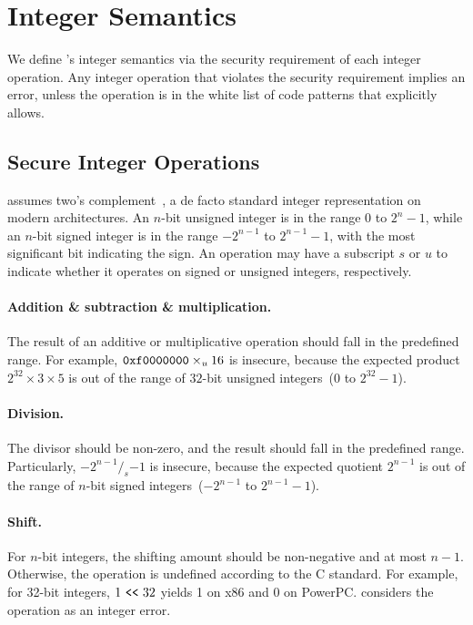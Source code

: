 \section{Integer Semantics}
\label{s:sema}

We define \sys's integer semantics via the security requirement of
each integer operation.  Any integer operation that violates the
security requirement implies an error, unless the operation is in
the white list of code patterns that \sys explicitly allows.

\subsection{Secure Integer Operations}
\label{s:sema:sec}

\sys assumes two's complement~\cite[\chapterautorefname~4.2.1]{intel:vol1},
a de facto standard integer representation on modern architectures.
An $n$-bit unsigned integer is in the range $0$ to $2^n-1$, while
an $n$-bit signed integer is in the range $-2^{n-1}$ to $2^{n-1}-1$,
with the most significant bit indicating the sign.  An operation
may have a subscript $s$ or $u$ to indicate whether it operates on
signed or unsigned integers, respectively.

\paragraph{Addition \& subtraction \& multiplication.}
The result of an additive or multiplicative operation should fall
in the predefined range.  For example,
$\texttt{0xf0000000}\times_u 16$ is insecure,
because the expected product $2^{32}\times
3\times 5$ is out of the range of $32$-bit unsigned integers~($0$
to $2^{32} - 1$).

\paragraph{Division.}
The divisor should be non-zero,
and the result should fall in the predefined range.
Particularly, $-2^{n-1} /_s {-1}$ is insecure,
because the expected quotient $2^{n-1}$ is out of
the range of $n$-bit signed integers~($-2^{n-1}$ to $2^{n-1}-1$).

\paragraph{Shift.}
For $n$-bit integers, the shifting amount should be non-negative
and at most $n-1$.  Otherwise, the operation is undefined according
to the C standard.  For example, for 32-bit integers, $1 \ \texttt{<}\texttt{<}\  32$ yields 1
on x86 and 0 on PowerPC.  \sys considers the operation as an integer
error.

